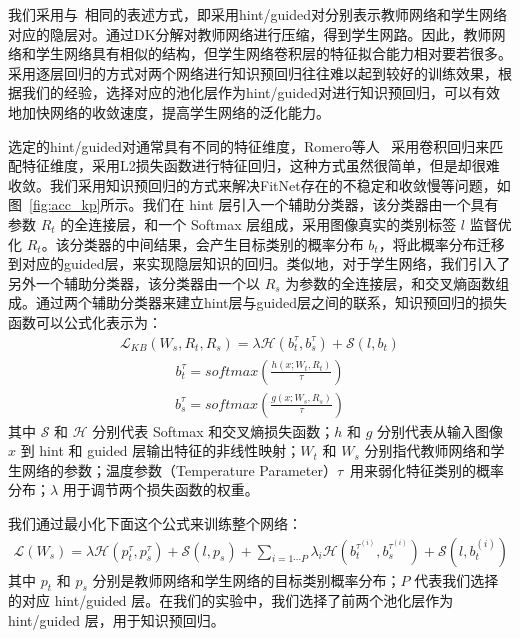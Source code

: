 我们采用与~\cite{romero2014fitnets}相同的表述方式，即采用hint/guided对分别表示教师网络和学生网络对应的隐层对。通过DK分解对教师网络进行压缩，得到学生网路。因此，教师网络和学生网络具有相似的结构，但学生网络卷积层的特征拟合能力相对要若很多。采用逐层回归的方式对两个网络进行知识预回归往往难以起到较好的训练效果，根据我们的经验，选择对应的池化层作为hint/guided对进行知识预回归，可以有效地加快网络的收敛速度，提高学生网络的泛化能力。

选定的hint/guided对通常具有不同的特征维度，Romero等人~\cite{romero2014fitnets} 采用卷积回归来匹配特征维度，采用L2损失函数进行特征回归，这种方式虽然很简单，但是却很难收敛。我们采用知识预回归的方式来解决FitNet存在的不稳定和收敛慢等问题，如图~\ref{fig:acc_kp}所示。我们在 hint 层引入一个辅助分类器，该分类器由一个具有参数 $R_t$ 的全连接层，和一个 Softmax 层组成，采用图像真实的类别标签 $l$ 监督优化 $R_t$。该分类器的中间结果，会产生目标类别的概率分布 $b_t$，将此概率分布迁移到对应的guided层，来实现隐层知识的回归。类似地，对于学生网络，我们引入了另外一个辅助分类器，该分类器由一个以 $R_s$ 为参数的全连接层，和交叉熵函数组成。通过两个辅助分类器来建立hint层与guided层之间的联系，知识预回归的损失函数可以公式化表示为：
\begin{align} \label{equ:bridge}
\mathcal{L}_{KB}(W_s, R_t, R_s)={\lambda}\mathcal{H}(b_t^{\tau}, b_s^{\tau})+\mathcal{S}(l, b_t)
\end{align}
\begin{align} \label{equ:bt}
b_t^{\tau}=\mathit{softmax}(\frac{h(x; W_t, R_t)}{\tau})
\end{align}
\begin{align} \label{equ:bs}
b_s^{\tau}=\mathit{softmax}(\frac{g(x; W_s, R_s)}{\tau})
\end{align}
其中 $\mathcal{S}$ 和 $\mathcal{H}$ 分别代表 Softmax 和交叉熵损失函数；$h$ 和 $g$ 分别代表从输入图像 $x$ 到 hint 和 guided 层输出特征的非线性映射；$W_t$ 和 $W_s$ 分别指代教师网络和学生网络的参数；温度参数（Temperature Parameter）$\tau$~\cite{hinton2015distilling}用来弱化特征类别的概率分布；${\lambda}$ 用于调节两个损失函数的权重。

我们通过最小化下面这个公式来训练整个网络：
\begin{align} \label{equ:all}
\mathcal{L}(W_s)={\lambda}\mathcal{H}(p_t^{\tau}, p_s^{\tau}) + \mathcal{S}(l, p_s) + \sum_{i=1{\cdots}P}{\lambda}_i\mathcal{H}(b_t^{\tau^{(i)}}, b_s^{\tau^{(i)}})+\mathcal{S}(l, b_t^{(i)})
\end{align}
其中 $p_t$ 和 $p_s$ 分别是教师网络和学生网络的目标类别概率分布；$P$ 代表我们选择的对应 hint/guided 层。在我们的实验中，我们选择了前两个池化层作为 hint/guided 层，用于知识预回归。


